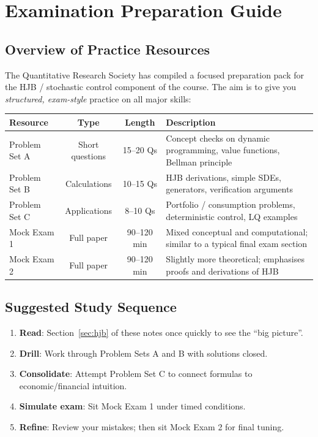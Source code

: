 \documentclass[12pt]{article}
\begin{document}
\appendix

\section{Examination Preparation Guide}

\subsection{Overview of Practice Resources}

The Quantitative Research Society has compiled a focused preparation pack for
the HJB / stochastic control component of the course. The aim is to give you
\emph{structured, exam-style} practice on all major skills:

\begin{center}
\begin{tabular}{l|c|c|p{5.5cm}}
\toprule
\textbf{Resource} & \textbf{Type} & \textbf{Length} & \textbf{Description} \\
\midrule
Problem Set A & Short questions & 15--20 Qs & Concept checks on dynamic programming, value functions, Bellman principle \\
Problem Set B & Calculations & 10--15 Qs & HJB derivations, simple SDEs, generators, verification arguments \\
Problem Set C & Applications & 8--10 Qs & Portfolio / consumption problems, deterministic control, LQ examples \\
Mock Exam 1 & Full paper & 90--120 min & Mixed conceptual and computational; similar to a typical final exam section \\
Mock Exam 2 & Full paper & 90--120 min & Slightly more theoretical; emphasises proofs and derivations of HJB \\
\bottomrule
\end{tabular}
\end{center}

\subsection{Suggested Study Sequence}

\begin{enumerate}[noitemsep]
  \item \textbf{Read}: Section~\ref{sec:hjb} of these notes once quickly to see the “big picture”.
  \item \textbf{Drill}: Work through Problem Sets A and B with solutions closed.
  \item \textbf{Consolidate}: Attempt Problem Set C to connect formulas to economic/financial intuition.
  \item \textbf{Simulate exam}: Sit Mock Exam 1 under timed conditions.
  \item \textbf{Refine}: Review your mistakes; then sit Mock Exam 2 for final tuning.
\end{enumerate}
\end{document}
